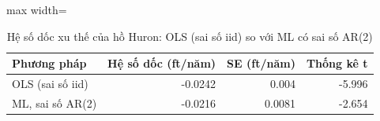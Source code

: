 \begin{table}[H]
\centering\footnotesize
\caption{Hệ số dốc xu thế của hồ Huron: OLS (sai số iid) so với ML có sai số AR(2)}\label{tab:tab_b11_03_slope_se}
\begin{adjustbox}{max width=\linewidth}
\begin{tabular}{|l|r|r|r|}
\toprule
Phương pháp & Hệ số dốc (ft/năm) & SE (ft/năm) & Thống kê t \\
\midrule
OLS (sai số iid) & -0.0242 & 0.004 & -5.996 \\
ML, sai số AR(2) & -0.0216 & 0.0081 & -2.654 \\
\bottomrule
\end{tabular}
\end{adjustbox}
\end{table}
